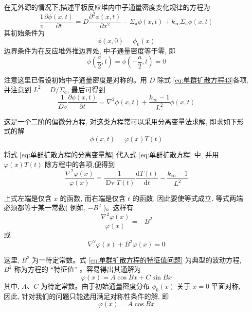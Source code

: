 \documentclass{Sichuan Normal University}
\begin{document}
在无外源的情况下,描述平板反应堆内中子通量密度变化规律的方程为
\begin{equation}
\frac{1}{v} \frac{\partial \phi(x, t)}{\partial t}=D \frac{\partial^2 \phi(x, t)}{\partial x^2}-\Sigma_{\mathrm{a}} \phi(x, t)+k_{\infty} \Sigma_{\mathrm{a}} \phi(x, t)
\label{eq:单群扩散方程43}
\end{equation}
其初始条件为
\begin{equation}
\phi(x, 0)=\phi_0(x)
\label{eq:初始条件44}
\end{equation}
边界条件为在反应堆外推边界处, 中子通量密度等于零, 即
\begin{equation}
\phi\left(\frac{a}{2}, t\right)=\phi\left(-\frac{a}{2}, t\right)=0
\label{eq:边界条件}
\end{equation}

注意这里已假设初始中子通量密度是对称的。用 $D$ 除式 \eqref{eq:单群扩散方程43}各项, 并注意到 $L^2=D / \Sigma_a$, 最后可得到
\begin{equation}
\frac{1}{D v} \frac{\partial \phi(x, t)}{\partial t}=\nabla^2 \phi(x, t)+\frac{k_{\infty}-1}{L^2} \phi(x, t)
\label{eq:单群扩散方程}
\end{equation}

这是一个二阶的偏微分方程, 对这类方程常可以采用分离变量法求解, 即求如下形式的解
\begin{equation}
\phi(x, t)=\varphi(x) T(t)
\label{eq:单群扩散方程的分离变量解}
\end{equation}

将式 \eqref{eq:单群扩散方程的分离变量解} 代入式 \eqref{eq:单群扩散方程} 中, 并用 $\varphi(x) T(t)$ 除方程中的各项,便得到
\begin{equation}
\frac{\nabla^2 \varphi(x)}{\varphi(x)}=\frac{1}{\operatorname{Dv} T(t)} \frac{\mathrm{d} T(t)}{\mathrm{d} t}-\frac{k_{\infty}-1}{L^2}
\label{eq:单群扩散方程的分离变量解48}
\end{equation}

上式左端是仅含 $x$ 的函数, 而右端是仅含 $t$ 的函数, 因此要使等式成立, 等式两端必须都等于某一常数( 例如, $-B^2$ )。这样有
\begin{equation}
\frac{\nabla^2 \varphi(x)}{\varphi(x)}=-B^2
\end{equation}
或
\begin{equation}
\nabla^2 \varphi(x)+B^2 \varphi(x)=0
\label{eq:单群扩散方程的特征值问题}
\end{equation}

这里, $B^2$ 为一待定常数。式 \eqref{eq:单群扩散方程的特征值问题} 为典型的波动方程, $B^2$ 称为方程的 “特征值” 。容易得出其通解为
\begin{equation}
\varphi(x)=A \cos B x+C \sin B x
\end{equation}
其中, $A 、 C$ 为待定常数。由于初始通量密度分布 $\phi_0(x)$ 关于 $x=0$ 平面对称, 因此, 针对我们的问题只能选用满足对称性条件的解, 即
\begin{equation}
\varphi(x)=A \cos B x
\end{equation}
\end{document}
